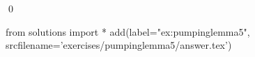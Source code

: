 
\begin{ex} 
  \label{ex:pumpinglemma5}
  
  \qed
\end{ex} 
\begin{python0}
from solutions import *
add(label="ex:pumpinglemma5",
    srcfilename='exercises/pumpinglemma5/answer.tex') 
\end{python0}
